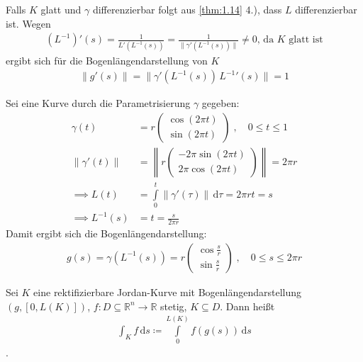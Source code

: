 \documentclass[a4paper,10pt]{scrbook}
\begin{document}
\begin{notice}[Folgerung:]
  Falls $K$ glatt und $\gamma$ differenzierbar folgt aus \ref{thm:1.14} 4.), dass $L$ differenzierbar ist. Wegen
  \begin{align*}
    (L^{-1})'(s) = \frac{1}{L'(L^{-1}(s))} = \frac{1}{\|\gamma'(L^{-1}(s))\|} \neq 0 \text{, da $K$ glatt ist}
  \end{align*}
  ergibt sich für die Bogenlängendarstellung von $K$
  \begin{align*}
    \|g'(s)\| = \|\gamma'(L^{-1}(s)) \, {L^{-1}}'(s)\| = 1
  \end{align*}
\end{notice}

\begin{example}
  Sei eine Kurve durch die Parametrisierung $\gamma$ gegeben:
  \begin{align*}
    \gamma(t) &= r \begin{pmatrix} \cos(2 \pi t) \\ \sin(2 \pi t) \end{pmatrix} \; , \quad 0 \leq t \leq 1 \\
    \|\gamma'(t)\| &= \left\| r \begin{pmatrix} -2 \pi \sin(2 \pi t) \\ 2 \pi \cos(2 \pi t) \end{pmatrix} \right\| = 2 \pi r \\
    \implies L(t) &= \int\limits_{0}^{t} \|\gamma'(\tau)\| \, \mathrm{d}\tau = 2 \pi r t = s \\
    \implies L^{-1}(s) &= t = \frac{s}{2 \pi r}
  \end{align*}
  Damit ergibt sich die Bogenlängendarstellung:
  \begin{align*}
    g(s) = \gamma(L^{-1}(s)) = r \begin{pmatrix} \cos\frac{s}{r} \\ \sin\frac{s}{r} \end{pmatrix} \; , \quad 0 \leq s \leq 2 \pi r
  \end{align*}
\end{example}

\begin{theorem}[Definition]
  Sei $K$ eine rektifizierbare Jordan-Kurve mit Bogenlängendarstellung $(g, [0,L(K)])$, $f : D \subseteq \mathbb{R}^n \to \mathbb{R}$ stetig, $K \subseteq D$. Dann heißt
  \begin{align*}
    \int_K f \, \mathrm{d}s \coloneq \int\limits_{0}^{L(K)} f(g(s)) \, \mathrm{d}s
  \end{align*}
  .
\end{theorem}
\end{document}
